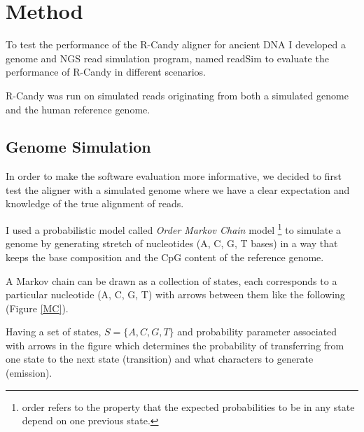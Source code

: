 \documentclass[11pt,a4paper]{report}
\begin{document}


\section{Method} \label{Method}

To test the performance of the R-Candy aligner for ancient DNA I developed a 
genome and NGS read simulation program, named readSim to evaluate the performance 
of R-Candy in different scenarios.

R-Candy was run on simulated reads originating from both a simulated genome and 
the human reference genome.
 


\subsection{Genome Simulation} 
\label{ Genome Simulation }


In order to make the software evaluation more informative, we decided to first 
test the aligner with a simulated genome where we have a clear expectation and
 knowledge of the true alignment of reads.

I used a probabilistic model called \emph{ Order Markov Chain} model 
\footnote{ order refers to the property that the expected probabilities 
to be in any state depend on one previous state.} to simulate 
a genome by generating stretch of nucleotides (A, C, G, T bases) in a way that  
keeps the base composition and the CpG content of the reference genome.

A Markov chain can be drawn as a collection of states, each corresponds to a 
particular nucleotide (A, C, G, T) with arrows between them like the following 
(Figure \ref{MC}). 

Having a set of states,  $ S= \{ A, C,  G, T \}$  and probability parameter 
associated with arrows in the figure which determines the probability of 
transferring from one state to the next state (transition) and what characters 
to generate (emission).
\end{document}
